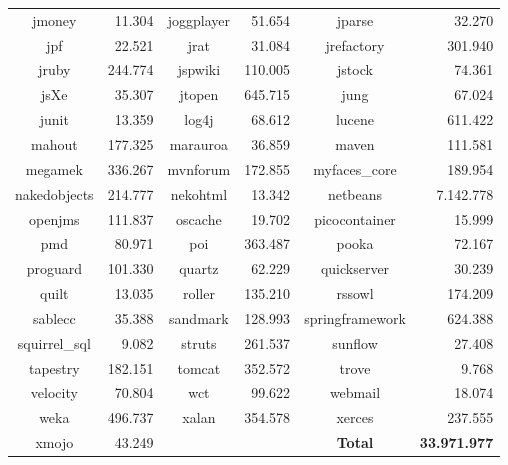 \begin{table}
\begin{tabularx}{\textwidth}{c|r||c|r||C|r}
		jmoney & 11.304 & joggplayer & 51.654 & jparse & 32.270 \\
		jpf & 22.521 & jrat & 31.084 & jrefactory & 301.940 \\
		jruby & 244.774 & jspwiki & 110.005 & jstock & 74.361 \\
		jsXe & 35.307 & jtopen & 645.715 & jung & 67.024 \\
		junit & 13.359 & log4j & 68.612 & lucene & 611.422 \\
		mahout & 177.325 & marauroa & 36.859 & maven & 111.581 \\
		megamek & 336.267 & mvnforum & 172.855 & myfaces\_core & 189.954 \\
		nakedobjects & 214.777 & nekohtml & 13.342 & netbeans & 7.142.778 \\
		openjms & 111.837 & oscache & 19.702 & picocontainer & 15.999 \\
		pmd & 80.971 & poi & 363.487 & pooka & 72.167 \\
		proguard & 101.330 & quartz & 62.229 & quickserver & 30.239 \\
		quilt & 13.035 & roller & 135.210 & rssowl & 174.209 \\
		sablecc & 35.388 & sandmark & 128.993 & springframework & 624.388 \\
		squirrel\_sql & 9.082 & struts & 261.537 & sunflow & 27.408 \\
		tapestry & 182.151 & tomcat & 352.572 & trove & 9.768 \\
		velocity & 70.804 & wct & 99.622 & webmail & 18.074 \\
		weka & 496.737 & xalan & 354.578 & xerces & 237.555 \\
		xmojo & 43.249 & & & \textbf{Total} & \textbf{33.971.977}
	\end{tabularx}
\end{table}
\setlength{\extrarowheight}{0em}
